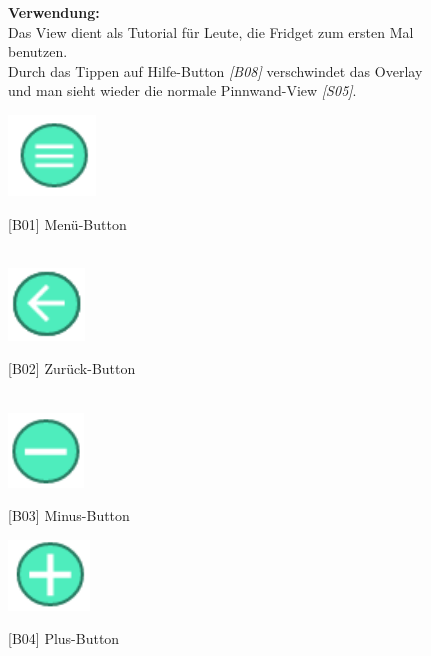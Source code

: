 \documentclass[a4paper]{scrreprt}
\begin{document}
\begin{figure}[h!]
\begin{minipage}[t]{0.55\linewidth}
\begin{itemize}
    			\end{itemize}
    			
    			
    			\hfill 
    			
    			\textbf{Verwendung:}\\
    			Das View dient als Tutorial für Leute, die Fridget
    			zum ersten Mal benutzen.\\ 
    			Durch das Tippen auf 
    			Hilfe-Button \textit{{[}B08{]}} verschwindet das Overlay und man 
    			sieht wieder die normale Pinnwand-View \textit{{[}S05{]}}.
    			
    		\end{minipage}
    	\end{figure}
    
    	\begin{figure}[h!]
    		\begin{minipage}[t]{0.45\linewidth}
    			\flushright
    			\centering
    			\vspace{9mm}
    			\includegraphics[width=0.05\textheight]{menu_button.PNG}
    			\caption{{[}B01{]} Menü-Button}
    			\label{fig:figure1}
    			\hfill \\
    			\includegraphics[width=0.05\textheight]{back_button.PNG}
    			\caption{{[}B02{]} Zurück-Button}
    			\label{fig:figure1}
    			\hfill \\
    			\includegraphics[width=0.05\textheight]{minus_button.PNG}
    			\caption{{[}B03{]} Minus-Button}
    			\label{fig:figure1}
    			\includegraphics[width=0.05\textheight]{plus_button.PNG}
    			\caption{{[}B04{]} Plus-Button}

\end{minipage}
\end{figure}
\end{document}
